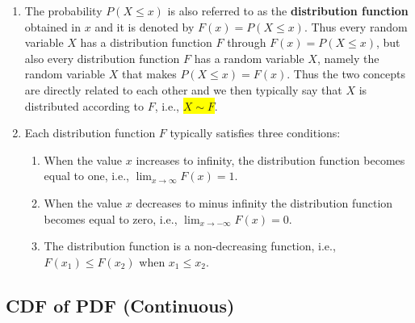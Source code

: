\begin{enumerate}
    \item The probability $P(X \leq x)$ is also referred to as the \textbf{distribution function} obtained in $x$ and it is denoted by $F(x) = P(X \leq x)$.
    Thus every random variable $X$ has a distribution function $F$ through $F(x) = P(X \leq x)$, but also every distribution function $F$ has a random variable $X$, namely the random variable $X$ that makes $P(X \leq x) = F(x)$.
    Thus the two concepts are directly related to each other and we then typically say that $X$ is distributed according to $F$, i.e., \colorbox{yellow}{$X \sim F$}.
    \hfill \cite{statistics/book/Statistics-for-Data-Scientists/Maurits-Kaptein}

    \item Each distribution function $F$ typically satisfies three conditions:
    \begin{enumerate}
        \item When the value $x$ increases to infinity, the distribution function becomes equal to one, i.e., $\lim _{x\to \infty} F(x) = 1$.
        \hfill \cite{statistics/book/Statistics-for-Data-Scientists/Maurits-Kaptein}

        \item When the value $x$ decreases to minus infinity the distribution function becomes equal to zero, i.e., $\lim _{x\to -\infty} F(x) = 0$.
        \hfill \cite{statistics/book/Statistics-for-Data-Scientists/Maurits-Kaptein}

        \item The distribution function is a non-decreasing function, i.e., $F(x_1) \leq F(x_2)$ when $x_1 \leq x_2$.
        \hfill \cite{statistics/book/Statistics-for-Data-Scientists/Maurits-Kaptein}
    \end{enumerate}


\end{enumerate}


\subsection{CDF of PDF (Continuous)}


